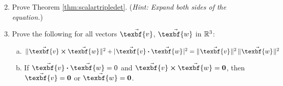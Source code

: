 \begin{enumerate}[\bfseries 1.]
\begin{multicols}{2}
 \end{multicols}
 \item Prove Theorem \ref{thm:scalartripledet}. (\emph{Hint: Expand both sides of the equation.})
 \item Prove the following for all vectors $\vec{\texbf{v}}$, $\vec{\texbf{w}}$ in $\mathbb{R}^{3}$:
  \begin{enumerate}[(a)]
   \item $\norm{\Crossprod{\vec{\texbf{v}}}{\vec{\texbf{w}}}}^2 + \abs{\Dotprod{\vec{\texbf{v}}}{\vec{\texbf{w}}}}^2 =
    \norm{\vec{\texbf{v}}}^2 \, \norm{\vec{\texbf{w}}}^2$
   \item If $\Dotprod{\vec{\texbf{v}}}{\vec{\texbf{w}}} = 0$ and $\Crossprod{\vec{\texbf{v}}}{\vec{\texbf{w}}} = \textbf{0}$, then
    $\vec{\texbf{v}} = \textbf{0}$ or $\vec{\texbf{w}} = \textbf{0}$.
  \end{enumerate}


\end{enumerate}
